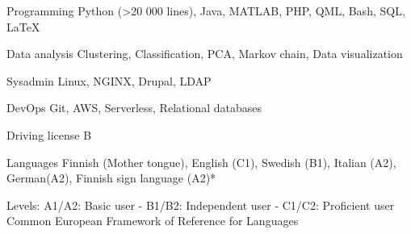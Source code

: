 

\begin{cvskills}

  \cvskill
    {Programming} %
    {Python (>20 000 lines), Java, MATLAB, PHP, QML, Bash, SQL, \LaTeX} %
    
  \cvskill
    {Data analysis} %
    {Clustering, Classification, PCA, Markov chain, Data visualization} %

  \cvskill
    {Sysadmin} %
    {Linux, NGINX, Drupal, LDAP} %
    
  \cvskill
    {DevOps} %
    {Git, AWS, Serverless, Relational databases} %
    
    
  \cvskill
    {Driving license} %
    {B} %

  \cvskill
    {Languages} %
    {Finnish (Mother tongue), English (C1), Swedish (B1), Italian (A2), German(A2), Finnish sign language (A2)*} %

\end{cvskills}

\begin{flushright}
{\tiny *Levels: A1/A2: Basic user - B1/B2: Independent user - C1/C2: Proficient user\\[-6pt]
Common European Framework of Reference for Languages}
\end{flushright}


